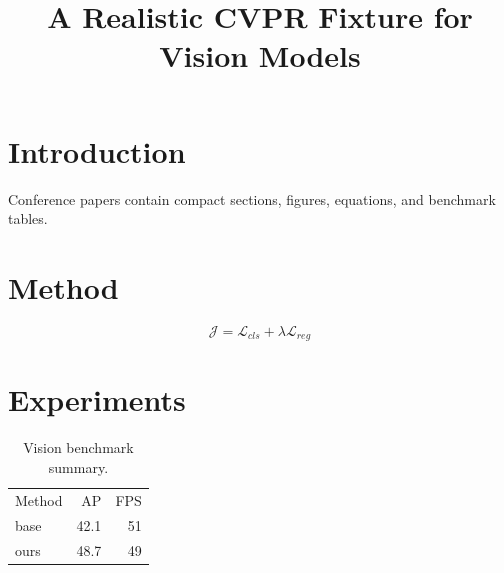 \documentclass[conference]{IEEEtran}
\begin{document}
\title{A Realistic CVPR Fixture for Vision Models}
\author{}
\maketitle
\section{Introduction}
Conference papers contain compact sections, figures, equations, and benchmark tables.
\section{Method}
\begin{equation}
  \mathcal{J} = \mathcal{L}_{cls} + \lambda \mathcal{L}_{reg}
\end{equation}
\section{Experiments}
\begin{table}[ht]
\centering
\begin{tabular}{lrr}
Method & AP & FPS\\
base & 42.1 & 51\\
ours & 48.7 & 49\\
\end{tabular}
\caption{Vision benchmark summary.}
\end{table}


\end{document}

